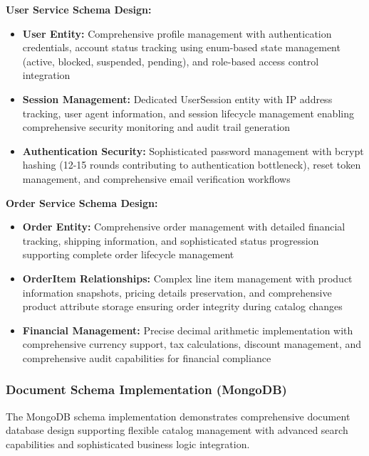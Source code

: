 \textbf{User Service Schema Design:}
\begin{itemize}
\item \textbf{User Entity:} Comprehensive profile management with authentication credentials, account status tracking using enum-based state management (active, blocked, suspended, pending), and role-based access control integration
\item \textbf{Session Management:} Dedicated UserSession entity with IP address tracking, user agent information, and session lifecycle management enabling comprehensive security monitoring and audit trail generation
\item \textbf{Authentication Security:} Sophisticated password management with bcrypt hashing (12-15 rounds contributing to authentication bottleneck), reset token management, and comprehensive email verification workflows
\end{itemize}

\textbf{Order Service Schema Design:}
\begin{itemize}
\item \textbf{Order Entity:} Comprehensive order management with detailed financial tracking, shipping information, and sophisticated status progression supporting complete order lifecycle management
\item \textbf{OrderItem Relationships:} Complex line item management with product information snapshots, pricing details preservation, and comprehensive product attribute storage ensuring order integrity during catalog changes
\item \textbf{Financial Management:} Precise decimal arithmetic implementation with comprehensive currency support, tax calculations, discount management, and comprehensive audit capabilities for financial compliance
\end{itemize}

\subsubsection{Document Schema Implementation (MongoDB)}

The MongoDB schema implementation demonstrates comprehensive document database design supporting flexible catalog management with advanced search capabilities and sophisticated business logic integration.

